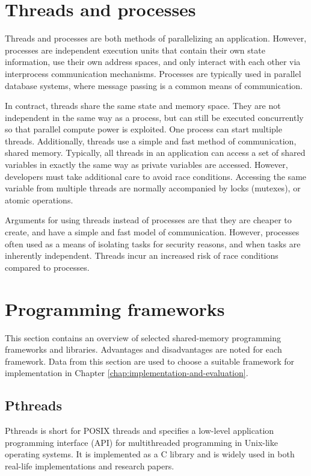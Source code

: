 \section{Threads and processes}

Threads and processes are both methods of parallelizing an
application.  However, processes are independent execution units that
contain their own state information, use their own address spaces, and
only interact with each other via interprocess communication
mechanisms. Processes are typically used in parallel database systems,
where message passing is a common means of communication. 

In contract, threads share the same state and memory space. They are
not independent in the same way as a process, but can still be
executed concurrently so that parallel compute power is exploited.
One process can start multiple threads. Additionally, threads use a
simple and fast method of communication, shared memory. Typically, all
threads in an application can access a set of shared variables in
exactly the same way as private variables are accessed. However,
developers must take additional care to avoid race conditions.
Accessing the same variable from multiple threads are normally
accompanied by locks (mutexes), or atomic operations.

Arguments for using threads instead of processes are that they are
cheaper to create, and have a simple and fast model of communication.
However, processes often used as a means of isolating tasks for
security reasons, and when tasks are inherently independent. Threads
incur an increased risk of race conditions compared to processes.

\section{Programming frameworks}

This section contains an overview of selected shared-memory
programming frameworks and libraries. Advantages and disadvantages are
noted for each framework. Data from this section are used to choose a
suitable framework for implementation in Chapter
\ref{chap:implementation-and-evaluation}.

\subsection{Pthreads}

Pthreads is short for POSIX threads and specifies a low-level
application programming interface (API) for multithreaded programming
in Unix-like operating systems. It is implemented as a C library and
is widely used in both real-life implementations and research papers.

